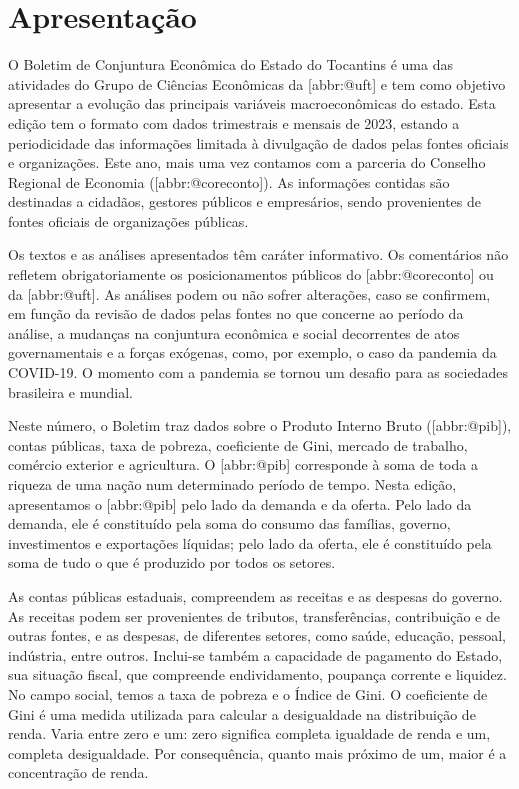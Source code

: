 \documentclass[
]{article}
\author{}
\date{\vspace{-2.5em}}
\begin{document}
\section*{Apresentação}\label{apresentauxe7uxe3o}

\begin{center}

\begin{minipage}{.7\linewidth}
O Boletim de Conjuntura Econômica do Estado do Tocantins é uma das
atividades do Grupo  de Ciências Econômicas da {[}abbr:@uft{]}
e tem como objetivo apresentar a evolução das principais variáveis
macroeconômicas do estado. Esta edição tem o formato com dados
trimestrais e mensais de 2023, estando a periodicidade das informações
limitada à divulgação de dados pelas fontes oficiais e organizações.
Este ano, mais uma vez contamos com a parceria do Conselho Regional de
Economia ({[}abbr:@coreconto{]}). As informações contidas são destinadas
a cidadãos, gestores públicos e empresários, sendo provenientes de
fontes oficiais de organizações públicas.

Os textos e as análises apresentados têm caráter informativo. Os
comentários não refletem obrigatoriamente os posicionamentos públicos do
{[}abbr:@coreconto{]} ou da {[}abbr:@uft{]}. As análises podem ou não
sofrer alterações, caso se confirmem, em função da revisão de dados
pelas fontes no que concerne ao período da análise, a mudanças na
conjuntura econômica e social decorrentes de atos governamentais e a
forças exógenas, como, por exemplo, o caso da pandemia da COVID-19. O
momento com a pandemia se tornou um desafio para as sociedades
brasileira e mundial.

Neste número, o Boletim traz dados sobre o Produto Interno Bruto
({[}abbr:@pib{]}), contas públicas, taxa de pobreza, coeficiente de
Gini, mercado de trabalho, comércio exterior e agricultura. O
{[}abbr:@pib{]} corresponde à soma de toda a riqueza de uma nação num
determinado período de tempo. Nesta edição, apresentamos o
{[}abbr:@pib{]} pelo lado da demanda e da oferta. Pelo lado da demanda,
ele é constituído pela soma do consumo das famílias, governo,
investimentos e exportações líquidas; pelo lado da oferta, ele é
constituído pela soma de tudo o que é produzido por todos os setores.

As contas públicas estaduais, compreendem as receitas e as despesas do
governo. As receitas podem ser provenientes de tributos, transferências,
contribuição e de outras fontes, e as despesas, de diferentes setores,
como saúde, educação, pessoal, indústria, entre outros. Inclui-se também
a capacidade de pagamento do Estado, sua situação fiscal, que compreende
endividamento, poupança corrente e liquidez. No campo social, temos a
taxa de pobreza e o Índice de Gini. O coeficiente de Gini é uma medida
utilizada para calcular a desigualdade na distribuição de renda. Varia
entre zero e um: zero significa completa igualdade de renda e um,
completa desigualdade. Por consequência, quanto mais próximo de um,
maior é a concentração de renda.


\end{minipage}
\end{center}
\end{document}
